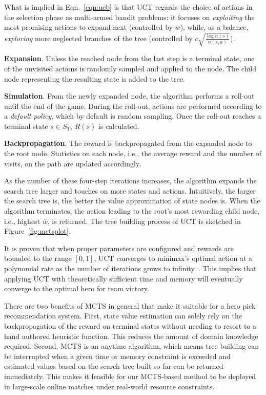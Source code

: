 What is implied in Eqn.~\ref{eqn:ucb} is that UCT regards the choice of actions in the selection phase as multi-armed bandit problems: it focuses on \textit{exploiting} the most promising actions to expand next (controlled by $\bar{w}$), while, as a balance,  \textit{exploring} more neglected branches of the tree (controlled by $c \sqrt{\frac{\log n(s)}{n(s, a)}}$). 
    
\textbf{Expansion}. Unless the reached node from the last step is a terminal state, one of the unvisited actions is randomly sampled and applied to the node. The child node representing the resulting state is added to the tree.

\textbf{Simulation}. From the newly expanded node, the algorithm performs a roll-out until the end of the game. During the roll-out, actions are performed according to a \textit{default policy}, which by default is random sampling. Once the roll-out reaches a terminal state $s \in S_T$, $R(s)$ is calculated.

\textbf{Backpropagation}. The reward is backpropagated from the expanded node to the root node. Statistics on each node, i.e., the average reward and the number of visits, on the path are updated accordingly.

As the number of these four-step iterations increases, the algorithm expands the search tree larger and touches on more states and actions. Intuitively, the larger the search tree is, the better the value approximation of state nodes is. When the algorithm terminates, the action leading to the root's most rewarding child node, i.e., highest $\bar{w}$, is returned. The tree building process of UCT is sketched in Figure~\ref{fig:mctsplot}.

It is proven that when proper parameters are configured and rewards are bounded to the range $[0,1]$, UCT converges to minimax's optimal action at a polynomial rate as the number of iterations grows to infinity~\citep{kocsis2006bandit}. This implies that applying UCT with theoretically sufficient time and memory will eventually converge to the optimal hero for team victory. 

There are two benefits of MCTS in general that make it suitable for a hero pick recommendation system. First, state value estimation can solely rely on the backpropagation of the reward on terminal states without needing to resort to a hand authored heuristic function. This reduces the amount of domain knowledge required. Second, MCTS is an anytime algorithm, which means tree building can be interrupted when a given time or memory constraint is exceeded and estimated values based on the search tree built so far can be returned immediately. This makes it feasible for our MCTS-based method to be deployed in large-scale online matches under real-world resource constraints.

